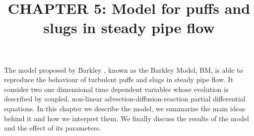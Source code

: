 \documentclass{article}
\title{CHAPTER 5: Model for puffs and slugs in steady pipe flow}
\date{}
\begin{document}
\maketitle
The model proposed by Barkley \cite{barkley2011modeling}, known as the Barkley Model, BM, is able to reproduce the behaviour of turbulent puffs and slugs in steady pipe flow. It consider two one dimensional time dependent variables whose evolution is described by coupled, non-linear advection-diffusion-reaction partial differential equations. In this chapter we describe the model, we summarize the main ideas behind it and how we interpret them. We finally discuss the results of the model and the effect of its parameters. 


















\end{document}
